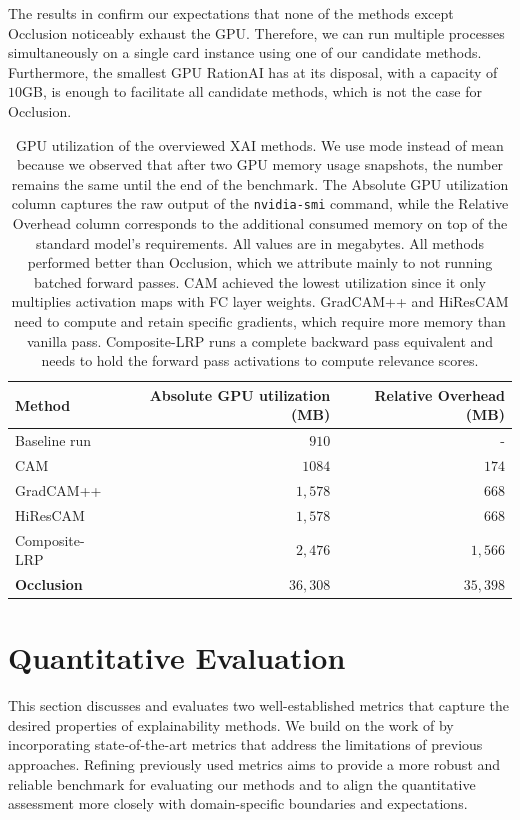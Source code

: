 The results in  confirm our expectations that none of the methods except Occlusion noticeably exhaust the GPU.
Therefore, we can run multiple processes simultaneously on a single card instance using one of our candidate methods.
Furthermore, the smallest GPU RationAI has at its disposal, with a capacity of $10$GB, is enough to facilitate all candidate methods, which is not the case for Occlusion.
\begin{table}
\centering
{}
\begin{tabular}{@{} l r r @{}}\toprule
Method & Absolute GPU utilization (MB) & Relative Overhead (MB) \\ 
\midrule
Baseline run       & $910$      & -       \\
CAM                & $1084$     & $174$   \\
GradCAM++          & $1,578$     & $668$   \\
HiResCAM           & $1,578$     & $668$   \\
Composite-LRP      & $2,476$     & $1,566$  \\
\textbf{Occlusion} & $36,308$    & $35,398$ \\
\bottomrule
\end{tabular}
\caption{
GPU utilization of the overviewed XAI methods.
We use mode instead of mean because we observed that after two GPU memory usage snapshots, the number remains the same until the end of the benchmark.
The Absolute GPU utilization column captures the raw output of the \texttt{nvidia-smi} command, while the Relative Overhead column corresponds to the additional consumed memory on top of the standard model's requirements.
All values are in megabytes.
All methods performed better than Occlusion, which we attribute mainly to not running batched forward passes.
CAM achieved the lowest utilization since it only multiplies activation maps with FC layer weights.
GradCAM++ and HiResCAM need to compute and retain specific gradients, which require more memory than vanilla pass.
Composite-LRP runs a complete backward pass equivalent and needs to hold the forward pass activations to compute relevance scores.
}
\label{tab:gpu-util}
\end{table}


\section{Quantitative Evaluation}\label{sec:quant}

This section discusses and evaluates two well-established metrics that capture the desired properties of explainability methods.
We build on the work of \cite{gallo} by incorporating state-of-the-art metrics that address the limitations of previous approaches.
Refining previously used metrics aims to provide a more robust and reliable benchmark for evaluating our methods and to align the quantitative assessment more closely with domain-specific boundaries and expectations.


